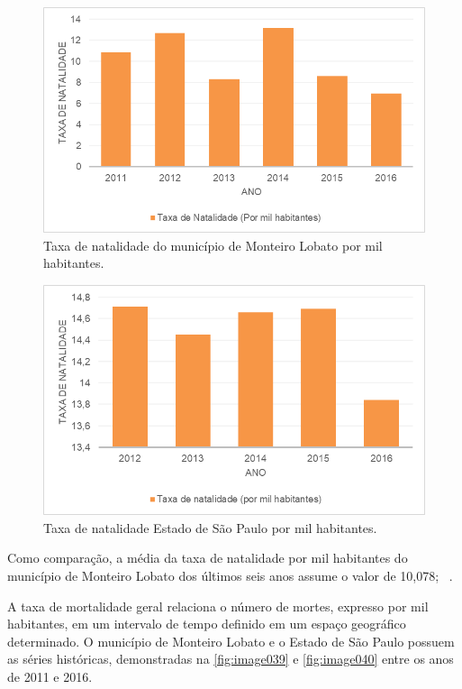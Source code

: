  \begin{figure}[h!]
	\centering
	\includegraphics[width=0.9\linewidth]{produtos/proddois/image037}
	\caption{Taxa de natalidade do município de Monteiro Lobato por mil habitantes.}
	\label{fig:image037}
\end{figure}
\newpage
 \begin{figure}[h!]
	\centering
	\includegraphics[width=0.9\linewidth]{produtos/proddois/image038}
	\caption{Taxa de natalidade Estado de São Paulo por mil habitantes.}
	\label{fig:image038}
\end{figure}

Como comparação, a média da taxa de natalidade por mil habitantes do município de Monteiro Lobato dos últimos seis anos assume o valor de 10,078; ~\cite{SEADE2017}.

A taxa de mortalidade geral relaciona o número de mortes, expresso por mil habitantes, em um intervalo de tempo definido em um espaço geográfico determinado. O município de Monteiro Lobato e o Estado de São Paulo possuem as séries históricas, demonstradas na \autoref{fig:image039} e \autoref{fig:image040}  entre os anos de 2011 e 2016.

